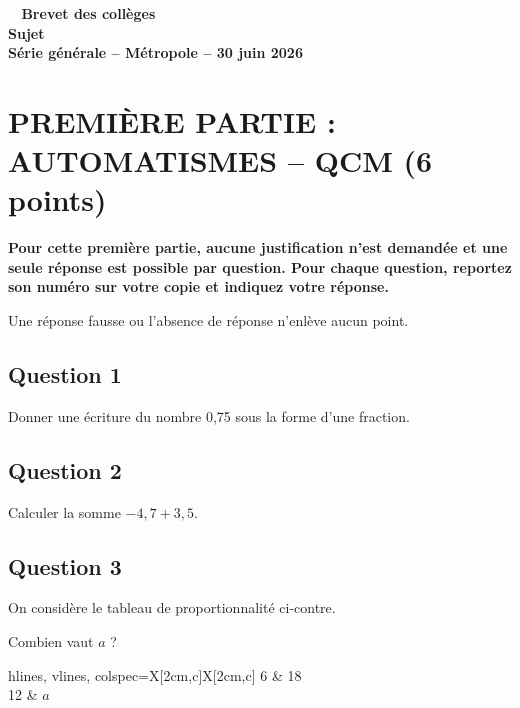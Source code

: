 \documentclass[12pt,a4paper,french]{article}
\begin{document}
\pagestyle{fancy}

\thispagestyle{empty}


\begin{center}
{\Large \textbf{
		\decofourleft~ Brevet des collèges ~\decofourright\\[10pt]
		Sujet\\[10pt]
		Série générale -- Métropole -- 30 juin 2026 }}
\end{center}


\section*{\centering PREMIÈRE PARTIE : AUTOMATISMES -- QCM (6 points)}

\textbf{Pour cette première partie, aucune justification n'est demandée et une seule réponse est possible par question. Pour chaque question, reportez son numéro sur votre copie et indiquez votre réponse.}

Une réponse fausse ou l'absence de réponse n'enlève aucun point.

\subsection*{Question 1}
Donner une écriture du nombre 0,75 sous la forme d'une fraction.

\subsection*{Question 2}
Calculer la somme \quad $-4,7 + 3,5$.

\subsection*{Question 3}
\begin{minipage}{0.6\linewidth}
	On considère le tableau de proportionnalité ci-contre.

	Combien vaut $a$ ?
\end{minipage}
\hfill
\begin{tblr}{hlines, vlines, colspec={X[2cm,c]X[2cm,c]}}
		6 & 18 \\
		12 & $a$ \\
\end{tblr}
\hfill~
\end{document}

